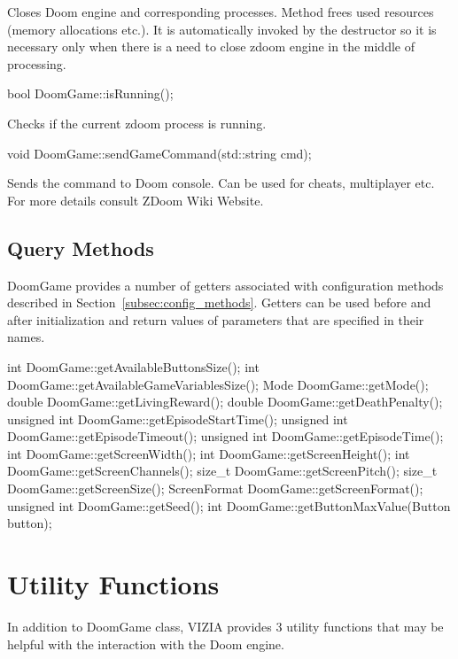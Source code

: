 	Closes Doom engine and corresponding processes. Method frees used resources (memory allocations etc.). It is automatically invoked by the destructor so it is necessary only when there is a need to close zdoom engine in the middle of processing.


\vspace{20pt}
\begin{clinee}
	bool DoomGame::isRunning();
\end{clinee}
	
	Checks if the current zdoom process is running.


\vspace{20pt}
\begin{clinee}
	void DoomGame::sendGameCommand(std::string cmd);
\end{clinee}

	Sends the command to Doom console. Can be used for cheats, multiplayer etc. For more details consult ZDoom Wiki Website\cite{zdoom-wiki}.


\vspace{20pt}
\subsection{Query Methods}

	DoomGame provides a number of getters associated with configuration methods described in Section~\ref{subsec:config_methods}. Getters can be used before and after initialization and return values of parameters that are specified in their names.


\vspace{20pt}
\begin{clinee}
int DoomGame::getAvailableButtonsSize();
int DoomGame::getAvailableGameVariablesSize();
Mode DoomGame::getMode();
double DoomGame::getLivingReward();
double DoomGame::getDeathPenalty();
unsigned int DoomGame::getEpisodeStartTime();
unsigned int DoomGame::getEpisodeTimeout();
unsigned int DoomGame::getEpisodeTime();
int DoomGame::getScreenWidth();
int DoomGame::getScreenHeight();
int DoomGame::getScreenChannels();
size_t DoomGame::getScreenPitch();
size_t DoomGame::getScreenSize();
ScreenFormat DoomGame::getScreenFormat();
unsigned int DoomGame::getSeed();
int DoomGame::getButtonMaxValue(Button button);
\end{clinee}


\section {Utility Functions}
	In addition to DoomGame class, VIZIA provides 3 utility functions that may be helpful with the interaction with the Doom engine.

